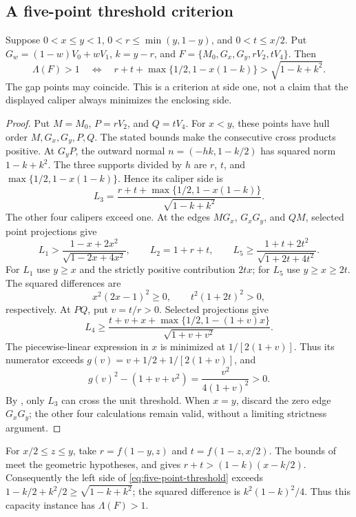 \subsection{A five-point threshold criterion}
\begin{lemma}
\label{lem:bc-five-point}
\label{lem:five-point-threshold}
Suppose $0<x\le y<1$, $0<r\le\min(y,1-y)$, and $0<t\le x/2$.
Put $G_w=(1-w)V_0+wV_1$, $k=y-r$, and
$F=\{M_0,G_x,G_y,rV_2,tV_4\}$. Then
\begin{equation}
 \Lambda(F)>1\quad\Longleftrightarrow\quad
 r+t+\max\{1/2,1-x(1-k)\}>\sqrt{1-k+k^2}.
 \label{eq:five-point-threshold}
\end{equation}
The gap points may coincide. This is a criterion at side one, not a
claim that the displayed caliper always minimizes the enclosing side.
\end{lemma}
\begin{proof}
Put $M=M_0$, $P=rV_2$, and $Q=tV_4$. For $x<y$, these points have
hull order $M,G_x,G_y,P,Q$. The stated bounds make the consecutive
cross products positive. At $G_yP$, the outward normal $n=(-hk,1-k/2)$ has
squared norm $1-k+k^2$. The three supports divided by $h$ are
$r$, $t$, and $\max\{1/2,1-x(1-k)\}$. Hence its caliper side is
\[
 L_3=\frac{r+t+\max\{1/2,1-x(1-k)\}}{\sqrt{1-k+k^2}}.
\]
The other four calipers exceed one. At the edges $MG_x$, $G_xG_y$,
and $QM$, selected point projections give
\[
 L_1>\frac{1-x+2x^2}{\sqrt{1-2x+4x^2}},\qquad
 L_2=1+r+t,\qquad
 L_5\ge\frac{1+t+2t^2}{\sqrt{1+2t+4t^2}}.
\]
For $L_1$ use $y\ge x$ and the strictly positive contribution $2tx$;
for $L_5$ use $y\ge x\ge2t$. The squared differences are
\[
 x^2(2x-1)^2\ge0,\qquad t^2(1+2t)^2>0,
\]
respectively. At $PQ$, put $v=t/r>0$. Selected projections give
\[
 L_4\ge\frac{t+v+x+\max\{1/2,1-(1+v)x\}}{\sqrt{1+v+v^2}}.
\]
The piecewise-linear expression in $x$ is minimized at $1/[2(1+v)]$.
Thus its numerator exceeds $g(v)=v+1/2+1/[2(1+v)]$, and
\[
 g(v)^2-(1+v+v^2)=\frac{v^2}{4(1+v)^2}>0.
\]
By , only $L_3$ can cross the unit threshold.
When $x=y$, discard the zero edge $G_xG_y$; the other four calculations
remain valid, without a limiting strictness argument.
\end{proof}

For $x/2\le z\le y$, take $r=f(1-y,z)$ and $t=f(1-z,x/2)$.
The bounds of  meet the geometric hypotheses,
and  gives $r+t>(1-k)(x-k/2)$.
Consequently the left side of \eqref{eq:five-point-threshold} exceeds
$1-k/2+k^2/2\ge\sqrt{1-k+k^2}$; the squared difference is
$k^2(1-k)^2/4$. Thus this capacity instance has $\Lambda(F)>1$.
